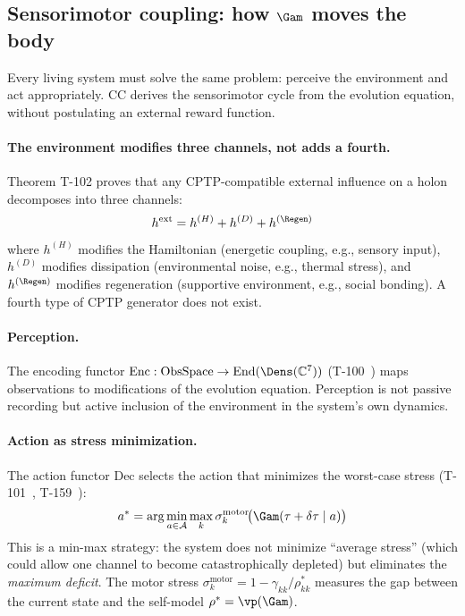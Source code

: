 \subsection{Sensorimotor coupling: how $\Gam$ moves the body}
\label{subsec:sensorimotor}

Every living system must solve the same problem: perceive the environment and act
appropriately.  CC derives the sensorimotor cycle from the evolution equation, without
postulating an external reward function.

\paragraph{The environment modifies three channels, not adds a fourth.}
Theorem T-102  proves that any CPTP-compatible external influence on a holon
decomposes into three channels:
\begin{equation}
  h^{\mathrm{ext}} = h^{(H)} + h^{(D)} + h^{(\Regen)}
  \label{eq:three-channels}
\end{equation}
where $h^{(H)}$ modifies the Hamiltonian (energetic coupling, e.g., sensory input),
$h^{(D)}$ modifies dissipation (environmental noise, e.g., thermal stress), and
$h^{(\Regen)}$ modifies regeneration (supportive environment, e.g., social bonding).
A fourth type of CPTP generator does not exist.

\paragraph{Perception.}
The encoding functor $\mathrm{Enc}: \mathrm{ObsSpace} \to \mathrm{End}(\Dens(\mathbb{C}^7))$
(T-100~) maps observations to modifications of the evolution equation.
Perception is not passive recording but active inclusion of the environment in the system's
own dynamics.

\paragraph{Action as stress minimization.}
The action functor $\mathrm{Dec}$ selects the action that minimizes the worst-case
stress (T-101~, T-159~):
\begin{equation}
  a^* = \arg\min_{a \in \mathcal{A}} \max_k \sigma^{\mathrm{motor}}_k\!\bigl(\Gam(\tau + \delta\tau \mid a)\bigr)
  \label{eq:optimal-action}
\end{equation}
This is a min-max strategy: the system does not minimize ``average stress'' (which could
allow one channel to become catastrophically depleted) but eliminates the \emph{maximum
deficit}.  The motor stress $\sigma^{\mathrm{motor}}_k = 1 - \gamma_{kk}/\rho^*_{kk}$
measures the gap between the current state and the self-model $\rho^* = \vp(\Gam)$.

